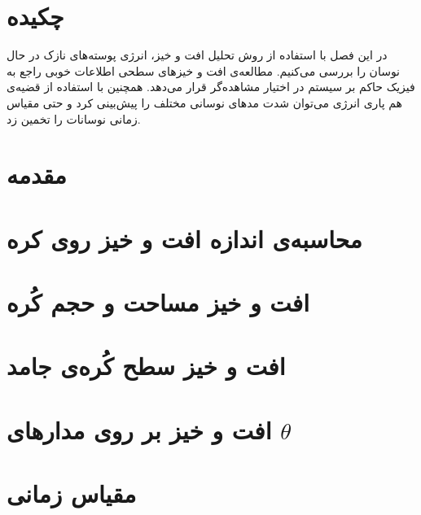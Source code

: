 \setRL
\clearpage
\def \MemFluc {\Mempath /MembraneFluc}

\section{
چکیده
}
در این فصل با استفاده از روش تحلیل افت و خیز، انرژی پوسته‌های نازک در حال نوسان را بررسی می‌کنیم. مطالعه‌ی افت و خیز‌های سطحی اطلاعات خوبی راجع به فیزیک حاکم بر سیستم در اختیار مشاهده‌گر قرار می‌دهد. همچنین با استفاده از قضیه‌ی هم پاری انرژی می‌توان شدت‌ مد‌های نوسانی مختلف را پیش‌بینی کرد و حتی مقیاس زمانی نوسانات را تخمین زد.

\section{
مقدمه
}



\section{
محاسبه‌ی اندازه افت و خیز روی کره
\label{sec:bendingFluctuations}
}


\section{
افت و خیز مساحت و حجم کُره
}


\section{
افت و خیز سطح کُره‌ی جامد
}


\section{
افت و خیز بر روی مدارهای
$\theta$
}


\section{
مقیاس زمانی
}







